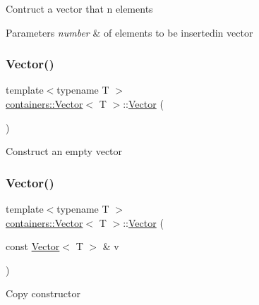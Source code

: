 Contruct a vector that {\ttfamily n} elements


\begin{DoxyParams}{Parameters}
{\em number} & of elements to be insertedin vector \\
\hline
\end{DoxyParams}
\mbox{\label{classcontainers_1_1_vector_aeb1cf60022c7fc50ae6b17b2cba845ea}} 
\subsubsection{\texorpdfstring{Vector()}{Vector()}\hspace{0.1cm}{\footnotesize\ttfamily [3/5]}}
{\footnotesize\ttfamily template$<$typename T $>$ \\
\hyperlink{classcontainers_1_1_vector}{containers\+::\+Vector}$<$ T $>$\+::\hyperlink{classcontainers_1_1_vector}{Vector} (\begin{DoxyParamCaption}{ }\end{DoxyParamCaption})\hspace{0.3cm}{\ttfamily [inline]}}

Construct an empty vector \mbox{\label{classcontainers_1_1_vector_a53ca201d23d5093f1f0a5680bf878a61}} 
\subsubsection{\texorpdfstring{Vector()}{Vector()}\hspace{0.1cm}{\footnotesize\ttfamily [4/5]}}
{\footnotesize\ttfamily template$<$typename T $>$ \\
\hyperlink{classcontainers_1_1_vector}{containers\+::\+Vector}$<$ T $>$\+::\hyperlink{classcontainers_1_1_vector}{Vector} (\begin{DoxyParamCaption}\item[{const \hyperlink{classcontainers_1_1_vector}{Vector}$<$ T $>$ \&}]{v }\end{DoxyParamCaption})\hspace{0.3cm}{\ttfamily [inline]}}

Copy constructor


